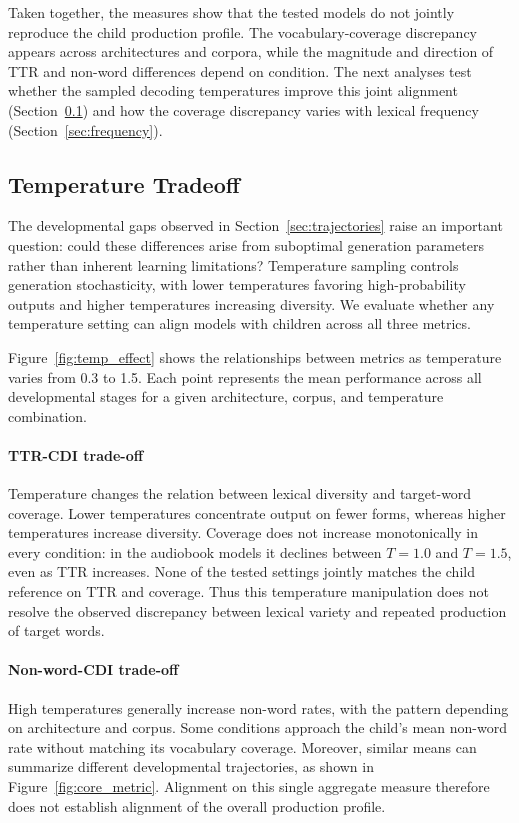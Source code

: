 Taken together, the measures show that the tested models do not jointly reproduce the child production profile. The vocabulary-coverage discrepancy appears across architectures and corpora, while the magnitude and direction of TTR and non-word differences depend on condition. The next analyses test whether the sampled decoding temperatures improve this joint alignment (Section~\ref{sec:temperature}) and how the coverage discrepancy varies with lexical frequency (Section~\ref{sec:frequency}).


\subsection{Temperature Tradeoff} 
\label{sec:temperature}

The developmental gaps observed in Section~\ref{sec:trajectories} raise an important question: could these differences arise from suboptimal generation parameters rather than inherent learning limitations? Temperature sampling controls generation stochasticity, with lower temperatures favoring high-probability outputs and higher temperatures increasing diversity. We evaluate whether any temperature setting can align models with children across all three metrics.

Figure~\ref{fig:temp_effect} shows the relationships between metrics as temperature varies from 0.3 to 1.5. Each point represents the mean performance across all developmental stages for a given architecture, corpus, and temperature combination.

\paragraph{TTR-CDI trade-off} Temperature changes the relation between lexical diversity and target-word coverage. Lower temperatures concentrate output on fewer forms, whereas higher temperatures increase diversity. Coverage does not increase monotonically in every condition: in the audiobook models it declines between $T=1.0$ and $T=1.5$, even as TTR increases. None of the tested settings jointly matches the child reference on TTR and \meCDI{} coverage. Thus this temperature manipulation does not resolve the observed discrepancy between lexical variety and repeated production of target words.


\paragraph{Non-word-CDI trade-off} High temperatures generally increase non-word rates, with the pattern depending on architecture and corpus. Some conditions approach the child's mean non-word rate without matching its vocabulary coverage. Moreover, similar means can summarize different developmental trajectories, as shown in Figure~\ref{fig:core_metric}. Alignment on this single aggregate measure therefore does not establish alignment of the overall production profile.


